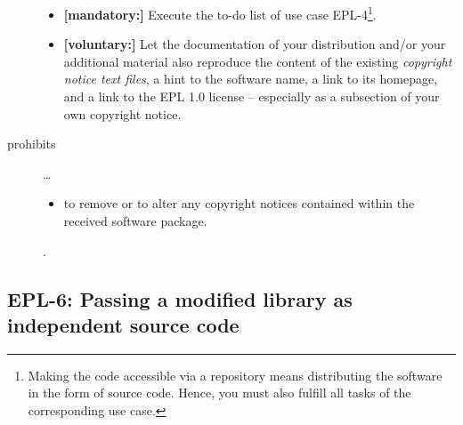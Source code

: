 \begin{description}
\begin{itemize}
  \item \textbf{[mandatory:]} Execute the to-do list of use case EPL-4\footnote{
  Making the code accessible via a repository means distributing the software in
  the form of source code. Hence, you must also fulfill all tasks of the
  corresponding use case.}.
 
  \item \textbf{[voluntary:]} Let the documentation of your distribution and/or
  your additional material  also reproduce the content of the existing
  \emph{copyright notice text files}, a hint to the software name, a link to its
  homepage, and a link to the EPL 1.0 license -- especially as a subsection of
  your own copyright notice.


\end{itemize}  

\item[prohibits] \ldots
\begin{itemize}
  \item to remove or to alter any copyright notices contained within the
  received software package.
\end{itemize}.

\end{description}

\subsection{EPL-6: Passing a modified library as independent source code}
\label{OSUC-08-EPL}

